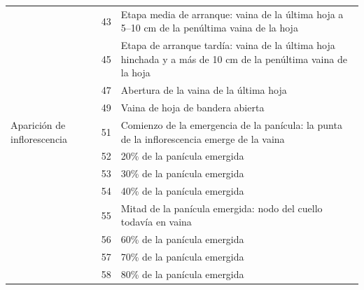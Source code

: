 \begin{longtable}{p{3cm}p{1cm}p{9cm}}
                                           & 43   & Etapa media de arranque: vaina de la última hoja a 5–10 cm de la penúltima vaina de la hoja                                              \\
                                           & 45   & Etapa de arranque tardía: vaina de la última hoja hinchada y a más de 10 cm de la penúltima vaina de la hoja                             \\
                                           & 47   & Abertura de la vaina de la última hoja                                                                                                   \\
                                           & 49   & Vaina de hoja de bandera abierta                                                                                                         \\ \hline
Aparición de inflorescencia                & 51   & Comienzo de la emergencia de la panícula: la punta de la inflorescencia emerge de la vaina                                               \\
                                           & 52   & 20\% de la panícula emergida                                                                                                             \\
                                           & 53   & 30\% de la panícula emergida                                                                                                             \\
                                           & 54   & 40\% de la panícula emergida                                                                                                             \\
                                           & 55   & Mitad de la panícula emergida: nodo del cuello todavía en vaina                                                                          \\
                                           & 56   & 60\% de la panícula emergida                                                                                                             \\
                                           & 57   & 70\% de la panícula emergida                                                                                                             \\
                                           & 58   & 80\% de la panícula emergida                                                                                                             \\

\end{longtable}

